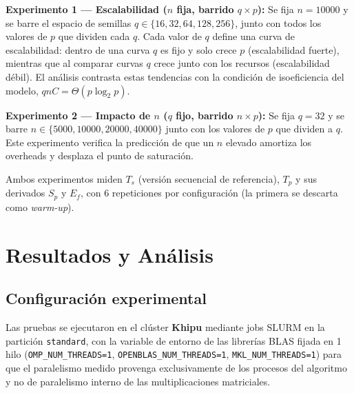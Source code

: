 \documentclass[11pt, a4paper]{article}
\begin{document}
\textbf{Experimento 1 --- Escalabilidad ($n$ fija, barrido $q \times p$):} Se fija $n = 10000$ y se barre el espacio de semillas $q \in \{16, 32, 64, 128, 256\}$, junto con todos los valores de $p$ que dividen cada $q$. Cada valor de $q$ define una curva de escalabilidad: dentro de una curva $q$ es fijo y solo crece $p$ (escalabilidad fuerte), mientras que al comparar curvas $q$ crece junto con los recursos (escalabilidad débil). El análisis contrasta estas tendencias con la condición de isoeficiencia del modelo, $qnC=\Theta(p\log_2 p)$.

\textbf{Experimento 2 --- Impacto de $n$ ($q$ fijo, barrido $n \times p$):} Se fija $q = 32$ y se barre $n \in \{5000, 10000, 20000, 40000\}$ junto con los valores de $p$ que dividen a $q$. Este experimento verifica la predicción de que un $n$ elevado amortiza los overheads y desplaza el punto de saturación.

Ambos experimentos miden $T_s$ (versión secuencial de referencia), $T_p$ y sus derivados $S_p$ y $E_f$, con 6 repeticiones por configuración (la primera se descarta como \textit{warm-up}).


\section{Resultados y Análisis}

\subsection{Configuración experimental}

Las pruebas se ejecutaron en el clúster \textbf{Khipu} mediante jobs SLURM en la partición \texttt{standard}, con la variable de entorno de las librerías BLAS fijada en 1 hilo (\texttt{OMP\_NUM\_THREADS=1}, \texttt{OPENBLAS\_NUM\_THREADS=1}, \texttt{MKL\_NUM\_THREADS=1}) para que el paralelismo medido provenga exclusivamente de los procesos del algoritmo y no de paralelismo interno de las multiplicaciones matriciales.
\end{document}
